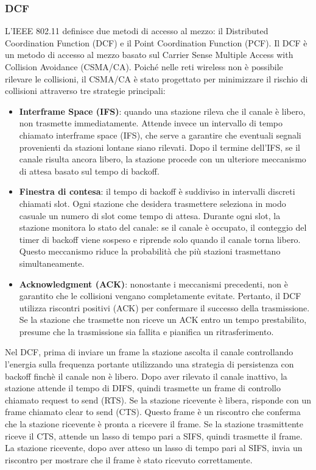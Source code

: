 \documentclass[12pt]{report}
\begin{document}
\subsubsection{DCF}
L'IEEE 802.11 definisce due metodi di accesso al mezzo: il Distributed Coordination Function (DCF) e il Point Coordination Function (PCF). Il DCF è un metodo di accesso al mezzo basato sul Carrier Sense Multiple Access with Collision Avoidance (CSMA/CA). Poiché nelle reti wireless non è possibile rilevare le collisioni, il CSMA/CA è stato progettato per minimizzare il rischio di collisioni attraverso tre strategie principali:
\begin{itemize}
	\item \textbf{Interframe Space (IFS)}: quando una stazione rileva che il canale è libero, non trasmette immediatamente. Attende invece un intervallo di tempo chiamato interframe space (IFS), che serve a garantire che eventuali segnali provenienti da stazioni lontane siano rilevati. Dopo il termine dell'IFS, se il canale risulta ancora libero, la stazione procede con un ulteriore meccanismo di attesa basato sul tempo di backoff.
	\item \textbf{Finestra di contesa}: il tempo di backoff è suddiviso in intervalli discreti chiamati slot. Ogni stazione che desidera trasmettere seleziona in modo casuale un numero di slot come tempo di attesa. Durante ogni slot, la stazione monitora lo stato del canale: se il canale è occupato, il conteggio del timer di backoff viene sospeso e riprende solo quando il canale torna libero. Questo meccanismo riduce la probabilità che più stazioni trasmettano simultaneamente.
	\item \textbf{Acknowledgment (ACK)}: nonostante i meccanismi precedenti, non è garantito che le collisioni vengano completamente evitate. Pertanto, il DCF utilizza riscontri positivi (ACK) per confermare il successo della trasmissione. Se la stazione che trasmette non riceve un ACK entro un tempo prestabilito, presume che la trasmissione sia fallita e pianifica un ritrasferimento.
\end{itemize}
Nel DCF,  prima di inviare un frame la stazione ascolta il canale controllando l'energia sulla frequenza portante utilizzando una strategia di persistenza con backoff finchè il canale non è libero. Dopo aver rilevato il canale inattivo, la stazione attende il tempo di DIFS, quindi trasmette un frame di controllo chiamato request to send (RTS). Se la stazione ricevente è libera, risponde con un frame chiamato clear to send (CTS). Questo frame è un riscontro che conferma che la stazione ricevente è pronta a ricevere il frame. Se la stazione trasmittente riceve il CTS, attende un lasso di tempo pari a SIFS, quindi trasmette il frame. La stazione ricevente, dopo aver atteso un lasso di tempo pari al SIFS, invia un riscontro per mostrare che il frame è stato ricevuto correttamente.
\end{document}
